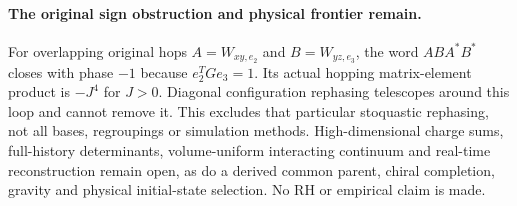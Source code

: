 \paragraph{The original sign obstruction and physical frontier remain.}
For overlapping original hops $A=W_{xy,e_2}$ and $B=W_{yz,e_3}$,
the word $ABA^*B^*$ closes with phase $-1$ because $e_2^TGe_3=1$.
Its actual hopping matrix-element product is $-J^4$ for $J>0$.
Diagonal configuration rephasing telescopes around this loop and cannot
remove it. This excludes that particular stoquastic rephasing, not all
bases, regroupings or simulation methods. High-dimensional charge sums,
full-history determinants, volume-uniform interacting continuum and
real-time reconstruction remain open, as do a derived common parent,
chiral completion, gravity and physical initial-state selection. No RH
or empirical claim is made.
